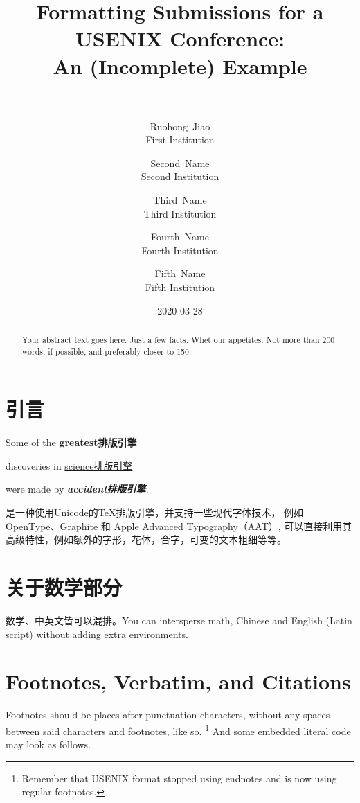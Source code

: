 \documentclass[a4paper,10pt,titlepage]{ctexart}
\title{\Large\bf Formatting Submissions for a USENIX Conference:\\
	An (Incomplete) Example\\
	\hologo{XeLaTeX}\\
}
\author{%
	{\rm Ruohong~Jiao}\\
	First Institution
	\and
	{\rm Second~Name}\\
	Second Institution
	\and
	{\rm Third~Name}\\
	Third Institution
	\and
	{\rm Fourth~Name}\\
	Fourth Institution
	\and
	{\rm Fifth~Name}\\
	Fifth Institution
}
\date{2020-03-28}
\begin{document}

\maketitle

\begin{abstract}
Your abstract text goes here. Just a few facts. Whet our appetites.
Not more than 200 words, if possible, and preferably closer to 150.
\end{abstract}


\section{引言}
Some of the \textbf{greatest排版引擎}\par
discoveries in \underline{science排版引擎}\par
were made by \textbf{\textit{accident排版引擎}}.\par

\XeTeX{}是一种使用Unicode的\TeX{}排版引擎，并支持一些现代字体技术，
例如 OpenType、Graphite 和 Apple Advanced Typography（AAT）, 可以直接利用其
高级特性，例如额外的字形，花体，合字，可变的文本粗细等等。\par

\lipsum[1]

\section{关于数学部分}
数学、中英文皆可以混排。You can intersperse math, Chinese and English 
(Latin script) without adding extra environments.

\section{Footnotes, Verbatim, and Citations}

Footnotes should be places after punctuation characters, without any
spaces between said characters and footnotes, like so.%
\footnote{Remember that USENIX format stopped using endnotes and is
  now using regular footnotes.} And some embedded literal code may
look as follows.
\end{document}
